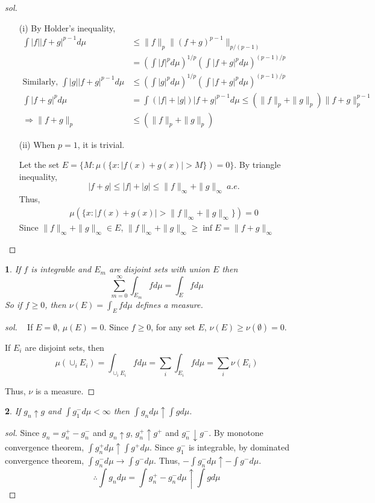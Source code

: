\documentclass{report}
\newtheorem{ex}{}[section]
\begin{document}
\begin{proof}[sol]~
\begin{enumerate}
    \item[(i)] By Holder's inequality,
    \begin{align*}
    \int |f||f+g|^{p-1}d\mu &\le \|f\|_p\|(f+g)^{p-1}\|_{p/(p-1)}\\
    &= (\int |f|^pd\mu)^{1/p}(\int |f+g|^pd\mu)^{(p-1)/p}\\
    \text{Similarly, }\int |g||f+g|^{p-1}d\mu &\le (\int |g|^pd\mu)^{1/p}(\int |f+g|^pd\mu)^{(p-1)/p}\\
    \int |f+g|^pd\mu &= \int (|f|+|g|)|f+g|^{p-1}d\mu \le (\|f\|_p+\|g\|_p)\|f+g\|_p^{p-1}\\
    \Rightarrow \|f+g\|_p &\le(\|f\|_p+\|g\|_p)
    \end{align*}
    \item[(ii)] When $p = 1$, it is trivial.
    
    Let the set $E = \{M: \mu(\{x : |f(x)+g(x)| > M\}) = 0\}$. By triangle inequality,
    \[|f+g| \le |f| + |g| \le \|f\|_\infty +\|g\|_\infty \ a.e.\]
    Thus,
    \begin{align*}
        \mu(\{x : |f(x)+g(x)| > \|f\|_\infty + \|g\|_\infty\}) = 0
    \end{align*}
    Since $\|f\|_\infty +\|g\|_\infty\in E$, $\|f\|_\infty +\|g\|_\infty \ge \inf E =\|f+g\|_\infty$
\end{enumerate}
\end{proof}
\begin{ex}
If $f$ is integrable and $E_m$ are disjoint sets with union $E$ then
\[\sum_{m=0}^\infty \int_{E_m} f d\mu = \int_E fd\mu\]
So if $f \ge 0$, then $\nu(E) = \int_E fd\mu$ defines a measure.
\end{ex}
\begin{proof}[sol]~
If $E = \emptyset$, $\mu(E) = 0$. Since $f \ge 0$, for any set $E$, $\nu(E) \ge \nu(\emptyset) = 0$.

If $E_i$ are disjoint sets, then
\[\mu(\cup_i E_i) = \int_{\cup_i E_i} fd\mu = \sum_i\int_{E_i}fd\mu = \sum_i \nu(E_i)\]

Thus, $\nu$ is a measure.
\end{proof}
\begin{ex}
If $g_n \uparrow g$ and $\int g_1^- d\mu < \infty$ then $\int g_n d\mu \uparrow \int gd\mu$.
\end{ex}
\begin{proof}[sol]
Since $g_n = g_n^+ - g_n^-$ and $g_n \uparrow g$, $g_n^+ \uparrow g^+$ and $g_n^- \downarrow g^-$. By monotone convergence theorem, $\int g_n^+d\mu \uparrow \int g^+d\mu$. Since $g_1^-$ is integrable, by dominated convergence theorem, $\int g_n^-d\mu\to \int g^-d\mu$. Thus, $-\int g_n^-d\mu\uparrow -\int g^-d\mu$.
\[\therefore \int g_nd\mu = \int g_n^+ - g_n^- d\mu \uparrow \int gd\mu\]
\end{proof}
\end{document}
